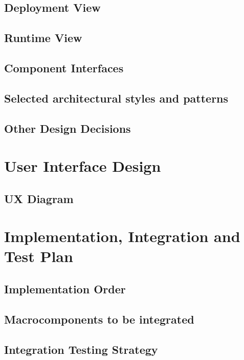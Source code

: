 \documentclass[12pt]{article}
\begin{document}
\subsection{Deployment View}\label{deploymentview}

\subsection{Runtime View}\label{runtimeview}

\subsection{Component Interfaces}\label{componentinterfaces}

\subsection{Selected architectural styles and patterns}\label{archstyles}

\subsection{Other Design Decisions}\label{otherdecisions}

\clearpage
\section{User Interface Design}
\subsection{UX Diagram}

\clearpage
\section{Implementation, Integration and Test Plan}
\subsection{Implementation Order}

\subsection{Macrocomponents to be integrated}
\subsection{Integration Testing Strategy}

\end{document}
